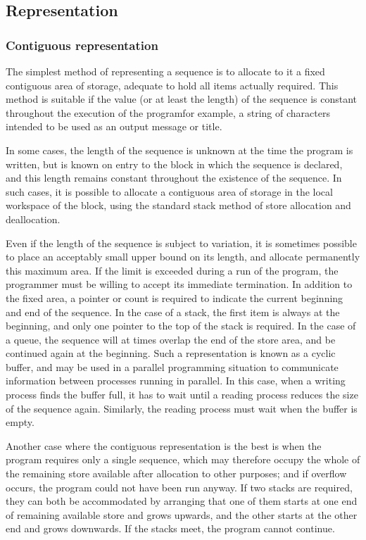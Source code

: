 \documentclass[twoside,11pt]{book}
\begin{document}
\subsection{Representation}

\subsubsection{Contiguous representation}

The simplest method of representing a sequence is to allocate to it a fixed contiguous area of storage, adequate to hold all items actually required. This method is suitable if the value (or at least the length) of the sequence is constant throughout the execution of the program\textemdash{}for example, a string of characters intended to be used as an output message or title.

In some cases, the length of the sequence is unknown at the time the program is written, but is known on entry to the block in which the sequence is declared, and this length remains constant throughout the existence of the sequence. In such cases, it is possible to allocate a contiguous area of storage in the local workspace of the block, using the standard stack method of store allocation and deallocation.

Even if the length of the sequence is subject to variation, it is sometimes possible to place an acceptably small upper bound on its length, and allocate permanently this maximum area. If the limit is exceeded during a run of the program, the programmer must be willing to accept its immediate termination. In addition to the fixed area, a pointer or count is required to indicate the current beginning and end of the sequence. In the case of a stack, the first item is always at the beginning, and only one pointer to the top of the stack is required. In the case of a queue, the sequence will at times overlap the end of the store area, and be continued again at the beginning. Such a representation is known as a cyclic buffer, and may be used in a parallel programming situation to communicate information between processes running in parallel. In this case, when a writing process finds the buffer full, it has to wait until a reading process reduces the size of the sequence again. Similarly, the reading process must wait when the buffer is empty.

Another case where the contiguous representation is the best is when the program requires only a single sequence, which may therefore occupy the whole of the remaining store available after allocation to other purposes; and if overflow occurs, the program could not have been run anyway. If two stacks are required, they can both be accommodated by arranging that one of them starts at one end of remaining available store and grows upwards, and the other starts at the other end and grows downwards. If the stacks meet, the program cannot continue.
\end{document}
